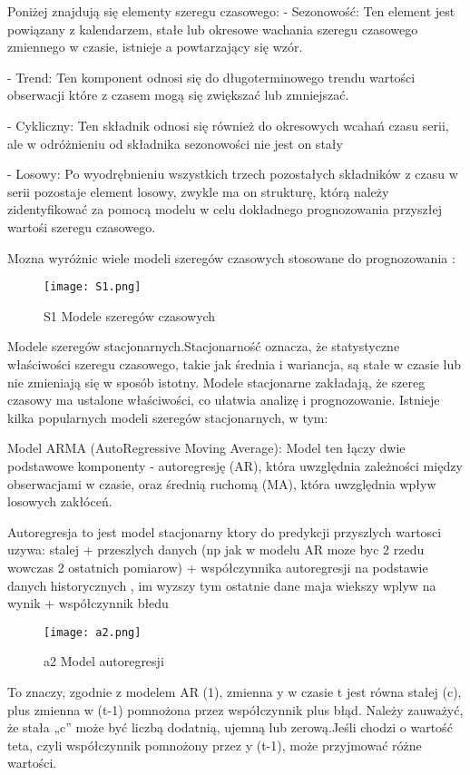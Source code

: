 Poniżej znajdują się elementy szeregu czasowego:
- Sezonowość: Ten element jest powiązany z kalendarzem,  stałe lub okresowe wachania szeregu czasowego zmiennego w czasie,  istnieje a powtarzający się wzór.

- Trend: Ten komponent odnosi się do długoterminowego trendu wartości obserwacji które z czasem mogą się zwiększać lub zmniejszać.

- Cykliczny: Ten składnik odnosi się również do okresowych wcahań czasu serii, ale w odróżnieniu od składnika sezonowości nie jest on stały 

- Losowy: Po wyodrębnieniu wszystkich trzech pozostałych składników z czasu w serii pozostaje element losowy, zwykle ma on strukturę, którą należy zidentyfikować za pomocą modelu w celu dokładnego prognozowania przyszłej wartośi szeregu czasowego.
\cite{Shekh2018}


Mozna wyróżnic wiele modeli szeregów czasowych stosowane do prognozowania :

\begin{figure}[h!]
    \label{fig:S1}
    \centering \texttt{[image: S1.png]}
    \caption{S1 Modele szeregów czasowych\cite{szer2009}}
\end{figure}

Modele szeregów stacjonarnych.Stacjonarność oznacza, że statystyczne właściwości szeregu czasowego, takie jak średnia i wariancja, są stałe w czasie lub nie zmieniają się w sposób istotny. Modele stacjonarne zakładają, że szereg czasowy ma ustalone właściwości, co ułatwia analizę i prognozowanie. Istnieje kilka popularnych modeli szeregów stacjonarnych, w tym: 

Model ARMA (AutoRegressive Moving Average): Model ten łączy dwie podstawowe komponenty - autoregresję (AR), która uwzględnia zależności między obserwacjami w czasie, oraz średnią ruchomą (MA), która uwzględnia wpływ losowych zakłóceń. 

Autoregresja to jest model stacjonarny ktory do predykcji przyszlych wartosci uzywa: stalej + przeszlych danych (np jak w modelu AR moze byc 2 rzedu wowczas 2 ostatnich pomiarow) + współczynnika autoregresji  na podstawie danych historycznych , im wyzszy tym ostatnie dane maja wiekszy wplyw na wynik + współczynnik błedu \cite{auto2023}\cite{autor2023}

\begin{figure}[h!]
    \label{fig:a2}
    \centering \texttt{[image: a2.png]}
    \caption{a2 Model autoregresji\cite{mod2023}}
\end{figure}
To znaczy, zgodnie z modelem AR (1), zmienna y w czasie t jest równa stałej (c), plus zmienna w (t-1) pomnożona przez współczynnik plus błąd. Należy zauważyć, że stała „c” może być liczbą dodatnią, ujemną lub zerową.Jeśli chodzi o wartość teta, czyli współczynnik pomnożony przez y (t-1), może przyjmować różne wartości.

